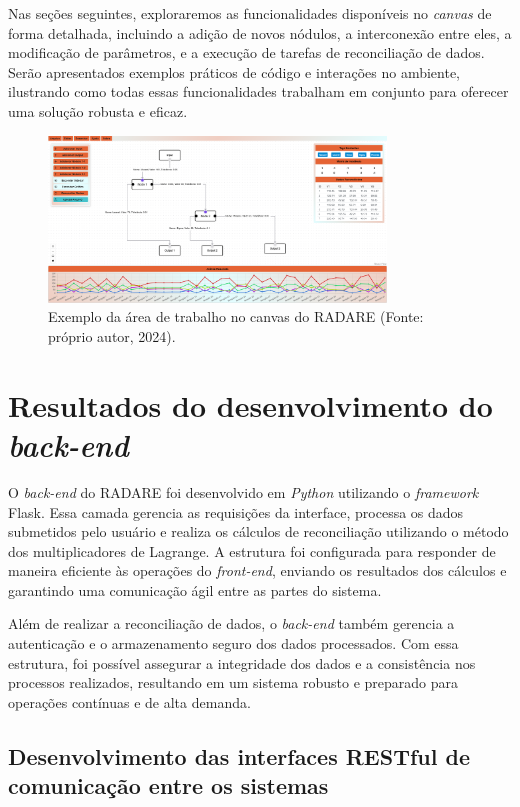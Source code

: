 Nas seções seguintes, exploraremos as funcionalidades disponíveis no \textit{canvas} de forma detalhada, incluindo a adição de novos nódulos, a interconexão entre eles, a modificação de parâmetros, e a execução de tarefas de reconciliação de dados. Serão apresentados exemplos práticos de código e interações no ambiente, ilustrando como todas essas funcionalidades trabalham em conjunto para oferecer uma solução robusta e eficaz.
 
\begin{figure}[htbp]
    \centering
    \includegraphics[width=0.8\textwidth]{figuras/interface-completa.png}
    \caption{Exemplo da área de trabalho no canvas do RADARE (Fonte: próprio autor, 2024).}
    \label{Fig:CanvasArea}
\end{figure}

\section{Resultados do desenvolvimento do \textit{back-end}}

O \textit{back-end} do RADARE foi desenvolvido em \textit{Python} utilizando o \textit{framework} Flask. Essa camada gerencia as requisições da interface, processa os dados submetidos pelo usuário e realiza os cálculos de reconciliação utilizando o método dos multiplicadores de Lagrange. A estrutura foi configurada para responder de maneira eficiente às operações do \textit{front-end}, enviando os resultados dos cálculos e garantindo uma comunicação ágil entre as partes do sistema.

Além de realizar a reconciliação de dados, o \textit{back-end} também gerencia a autenticação e o armazenamento seguro dos dados processados. Com essa estrutura, foi possível assegurar a integridade dos dados e a consistência nos processos realizados, resultando em um sistema robusto e preparado para operações contínuas e de alta demanda.

\subsection{Desenvolvimento das interfaces RESTful de comunicação entre os sistemas}

